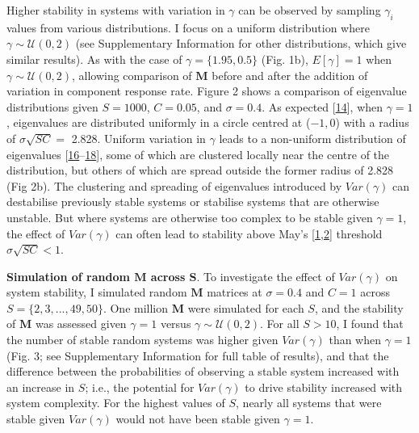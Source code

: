 \documentclass[]{article}
\begin{document}
Higher stability in systems with variation in \(\gamma\) can be observed
by sampling \(\gamma_{i}\) values from various distributions. I focus on
a uniform distribution where \(\gamma \sim \mathcal{U}(0, 2)\) (see
Supplementary Information for other distributions, which give similar
results). As with the case of \(\gamma = \{1.95, 0.5\}\) (Fig. 1b),
\(E[\gamma] = 1\) when \(\gamma \sim \mathcal{U}(0, 2)\), allowing
comparison of \(\mathbf{M}\) before and after the addition of variation
in component response rate. Figure 2 shows a comparison of eigenvalue
distributions given \(S = 1000\), \(C = 0.05\), and \(\sigma = 0.4\). As
expected {[}\protect\hyperlink{ref-Tao2010}{14}{]}, when \(\gamma = 1\),
eigenvalues are distributed uniformly in a circle centred at (\(-1, 0\))
with a radius of \(\sigma\sqrt{SC} =\) 2.828. Uniform variation in
\(\gamma\) leads to a non-uniform distribution of eigenvalues
{[}\protect\hyperlink{ref-Ahmadian2015}{16}--\protect\hyperlink{ref-Stone2017}{18}{]},
some of which are clustered locally near the centre of the distribution,
but others of which are spread outside the former radius of 2.828 (Fig
2b). The clustering and spreading of eigenvalues introduced by
\(Var(\gamma)\) can destabilise previously stable systems or stabilise
systems that are otherwise unstable. But where systems are otherwise too
complex to be stable given \(\gamma = 1\), the effect of \(Var(\gamma)\)
can often lead to stability above May's
{[}\protect\hyperlink{ref-May1972}{1},\protect\hyperlink{ref-Allesina2012}{2}{]}
threshold \(\sigma\sqrt{SC} < 1\).

\textbf{Simulation of random \(\mathbf{M}\) across \(\mathbf{S}\)}. To
investigate the effect of \(Var(\gamma)\) on system stability, I
simulated random \(\mathbf{M}\) matrices at \(\sigma = 0.4\) and
\(C = 1\) across \(S = \{2, 3, ..., 49, 50\}\). One million
\(\mathbf{M}\) were simulated for each \(S\), and the stability of
\(\mathbf{M}\) was assessed given \(\gamma = 1\) versus
\(\gamma \sim \mathcal{U}(0, 2)\). For all \(S > 10\), I found that the
number of stable random systems was higher given \(Var(\gamma)\) than
when \(\gamma = 1\) (Fig. 3; see Supplementary Information for full
table of results), and that the difference between the probabilities of
observing a stable system increased with an increase in \(S\); i.e., the
potential for \(Var(\gamma)\) to drive stability increased with system
complexity. For the highest values of \(S\), nearly all systems that
were stable given \(Var(\gamma)\) would not have been stable given
\(\gamma = 1\).
\end{document}

